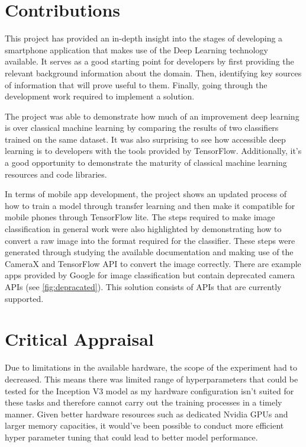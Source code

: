 \documentclass[12pt,a4paper]{report}
\begin{document}
\section{Contributions}

This project has provided an in-depth insight into the stages of developing a smartphone application that makes use of 
the Deep Learning technology available. It serves as a good starting point for developers by first providing the 
relevant background information about the domain. Then, identifying key sources of information that will prove useful to
them. Finally, going through the development work required to implement a solution.

\par

The project was able to demonstrate how much of an improvement deep learning is over classical machine learning by 
comparing the results of two classifiers trained on the same dataset. It was also surprising to see how accessible deep
learning is to developers with the tools provided by TensorFlow. Additionally, it's a good opportunity to demonstrate 
the maturity of classical machine learning resources and code libraries.

\par

In terms of mobile app development, the project shows an updated process of how to train a model through transfer 
learning and then make it compatible for mobile phones through TensorFlow lite. The steps required to make image 
classification in general work were also highlighted by demonstrating how to convert a raw image into the format 
required for the classifier. These steps were generated through studying the available documentation and making use of 
the CameraX and TensorFlow API to convert the image correctly. There are example apps provided by Google for image 
classification but contain deprecated camera APIs (see \ref{fig:depracated}). This solution consists of APIs that are 
currently supported.

\section{Critical Appraisal}

Due to limitations in the available hardware, the scope of the experiment had to decreased. This means there was limited
range of hyperparameters that could be tested for the Inception V3 model as my hardware configuration isn't suited for 
these tasks and therefore cannot carry out the training processes in a timely manner. Given better hardware resources 
such as dedicated Nvidia GPUs and larger memory capacities, it would've been possible to conduct more efficient hyper 
parameter tuning that could lead to better model performance. 
\end{document}
